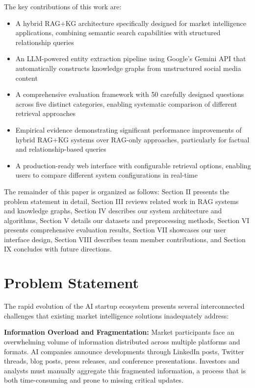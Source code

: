 \documentclass[11pt,twocolumn]{article}
\begin{document}
The key contributions of this work are:

\begin{itemize}
\item A hybrid RAG+KG architecture specifically designed for market intelligence applications, combining semantic search capabilities with structured relationship queries
\item An LLM-powered entity extraction pipeline using Google's Gemini API that automatically constructs knowledge graphs from unstructured social media content
\item A comprehensive evaluation framework with 50 carefully designed questions across five distinct categories, enabling systematic comparison of different retrieval approaches
\item Empirical evidence demonstrating significant performance improvements of hybrid RAG+KG systems over RAG-only approaches, particularly for factual and relationship-based queries
\item A production-ready web interface with configurable retrieval options, enabling users to compare different system configurations in real-time
\end{itemize}

The remainder of this paper is organized as follows: Section II presents the problem statement in detail, Section III reviews related work in RAG systems and knowledge graphs, Section IV describes our system architecture and algorithms, Section V details our datasets and preprocessing methods, Section VI presents comprehensive evaluation results, Section VII showcases our user interface design, Section VIII describes team member contributions, and Section IX concludes with future directions.

\section{Problem Statement}

The rapid evolution of the AI startup ecosystem presents several interconnected challenges that existing market intelligence solutions inadequately address:

\textbf{Information Overload and Fragmentation:} Market participants face an overwhelming volume of information distributed across multiple platforms and formats. AI companies announce developments through LinkedIn posts, Twitter threads, blog posts, press releases, and conference presentations. Investors and analysts must manually aggregate this fragmented information, a process that is both time-consuming and prone to missing critical updates.
\end{document}

